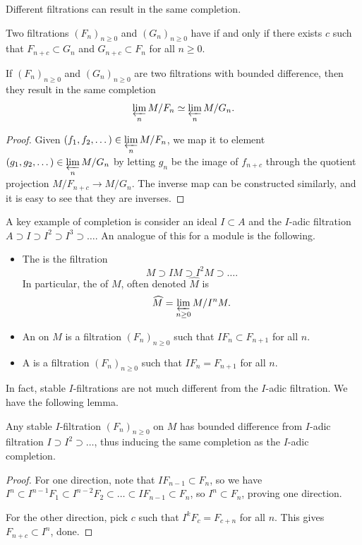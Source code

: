 Different filtrations can result in the same completion.
\begin{definition}
Two filtrations $(F_n)_{n\geq 0}$ 
and $(G_n)_{n\geq 0}$ have 
if and only if there exists $c$ such that
$F_{n+c}\subset G_n$ and $G_{n+c}\subset F_n$
for all $n\geq 0$.
\end{definition}
\begin{proposition}
    If $(F_n)_{n\geq 0}$ and $(G_n)_{n\geq 0}$
    are two filtrations with bounded difference,
    then they result in the same completion 
    $$\varprojlim\limits_n M/F_n \simeq \varprojlim\limits_n M/G_n.$$
\end{proposition}
\begin{proof}
    Given $(f_1,f_2,\dots) \in \varprojlim\limits_n M/F_n$,
    we map it to element $(g_1,g_2,\dots) \in \varprojlim\limits_n M/G_n$ by letting $g_n$ be the image of $f_{n+c}$
    through the quotient projection $M/F_{n+c}\to M/G_n$.
    The inverse map can be constructed similarly,
    and it is easy to see that they are inverses.
\end{proof}


A key example of completion is consider an ideal $I\subset A$
and the $I$-adic filtration 
$A\supset I\supset I^2\supset I^3\supset\dots$.
An analogue of this for a module is the following.
\begin{definition}
    \begin{itemize}
    \item The  is the filtration
    $$M\supset IM\supset I^2M\supset\dots.$$
    In particular, the 
    of $M$, often denoted $\widehat M$ is 
    $$\widehat M = \varprojlim_{n\geq 0} M/I^nM.$$
    \item 
    An  on $M$ is a filtration
    $(F_n)_{n\geq 0}$ such that $IF_n\subset F_{n+1}$ for all $n$.
    \item 
    A  is a filtration
    $(F_n)_{n\geq 0}$ such that $IF_n = F_{n+1}$ for all $n$.
    \end{itemize}
\end{definition}
In fact, stable $I$-filtrations are not much different
from the $I$-adic filtration. We have the following lemma.
\begin{lemma}
    Any stable $I$-filtration $(F_n)_{n\geq 0}$ on $M$
    has bounded difference from $I$-adic filtration
    $I\supset I^2\supset \dots$,
    thus inducing the same completion as the $I$-adic completion.
\end{lemma}
\begin{proof}
    For one direction, note that $IF_{n-1}\subset F_n$,
    so we have $I^n \subset I^{n-1}F_1\subset I^{n-2}F_2
    \subset\dots\subset IF_{n-1}\subset F_n$,
    so $I^n\subset F_n$, proving one direction.

    For the other direction, pick $c$ such that
    $I^k F_c = F_{c+n}$ for all $n$.
    This gives $F_{n+c}\subset I^n$, done.
\end{proof}
%
%
%
